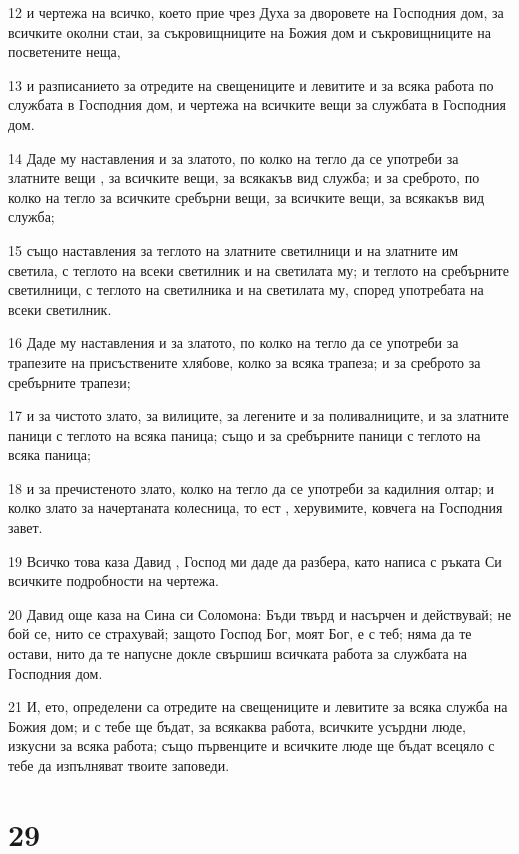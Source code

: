\par 12 и чертежа на всичко, което прие чрез Духа за дворовете на Господния дом, за всичките околни стаи, за съкровищниците на Божия дом и съкровищниците на посветените неща,
\par 13 и разписанието за отредите на свещениците и левитите и за всяка работа по службата в Господния дом, и чертежа на всичките вещи за службата в Господния дом.
\par 14 Даде му наставления и за златото, по колко на тегло да се употреби за златните вещи , за всичките вещи, за всякакъв вид служба; и за среброто, по колко на тегло за всичките сребърни вещи, за всичките вещи, за всякакъв вид служба;
\par 15 също наставления за теглото на златните светилници и на златните им светила, с теглото на всеки светилник и на светилата му; и теглото на сребърните светилници, с теглото на светилника и на светилата му, според употребата на всеки светилник.
\par 16 Даде му наставления и за златото, по колко на тегло да се употреби за трапезите на присъствените хлябове, колко за всяка трапеза; и за среброто за сребърните трапези;
\par 17 и за чистото злато, за вилиците, за легените и за поливалниците, и за златните паници с теглото на всяка паница; също и за сребърните паници с теглото на всяка паница;
\par 18 и за пречистеното злато, колко на тегло да се употреби за кадилния олтар; и колко злато за начертаната колесница, то ест , херувимите, ковчега на Господния завет.
\par 19 Всичко това каза Давид , Господ ми даде да разбера, като написа с ръката Си всичките подробности на чертежа.
\par 20 Давид още каза на Сина си Соломона: Бъди твърд и насърчен и действувай; не бой се, нито се страхувай; защото Господ Бог, моят Бог, е с теб; няма да те остави, нито да те напусне докле свършиш всичката работа за службата на Господния дом.
\par 21 И, ето, определени са отредите на свещениците и левитите за всяка служба на Божия дом; и с тебе ще бъдат, за всякаква работа, всичките усърдни люде, изкусни за всяка работа; също първенците и всичките люде ще бъдат всецяло с тебе да изпълняват твоите заповеди.

\chapter{29}

